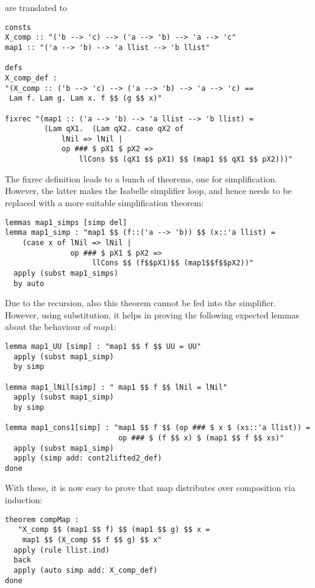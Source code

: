 \documentclass{llncs}
\begin{document}
\noindent 
are translated to

\begin{verbatim}
consts
X_comp :: "('b --> 'c) --> ('a --> 'b) --> 'a --> 'c"
map1 :: "('a --> 'b) --> 'a llist --> 'b llist"

defs
X_comp_def :
"(X_comp :: ('b --> 'c) --> ('a --> 'b) --> 'a --> 'c) ==
 Lam f. Lam g. Lam x. f $$ (g $$ x)"

fixrec "(map1 :: ('a --> 'b) --> 'a llist --> 'b llist) =
         (Lam qX1.  (Lam qX2. case qX2 of
             lNil => lNil |
             op ### $ pX1 $ pX2 =>
                 llCons $$ (qX1 $$ pX1) $$ (map1 $$ qX1 $$ pX2)))"
\end{verbatim}


\noindent 
The fixrec definition leads to a bunch of theorems, one for simplification.
However, the latter makes the Isabelle simplifier loop, and hence needs
to be replaced with a more suitable simplification theorem:
\begin{verbatim}
lemmas map1_simps [simp del]
lemma map1_simp : "map1 $$ (f::('a --> 'b)) $$ (x::'a llist) =
    (case x of lNil => lNil | 
               op ### $ pX1 $ pX2 => 
                    llCons $$ (f$$pX1)$$ (map1$$f$$pX2))"
  apply (subst map1_simps)
  by auto
\end{verbatim}

\noindent 
Due to the recursion, also this theorem cannot be fed into the simplifier.
However, using substitution, it helps in proving the following
expected lemmas about the behaviour of $map1$:

\begin{verbatim}
lemma map1_UU [simp] : "map1 $$ f $$ UU = UU"
  apply (subst map1_simp) 
  by simp

lemma map1_lNil[simp] : " map1 $$ f $$ lNil = lNil"
  apply (subst map1_simp) 
  by simp

lemma map1_cons1[simp] : "map1 $$ f $$ (op ### $ x $ (xs::'a llist)) =
                          op ### $ (f $$ x) $ (map1 $$ f $$ xs)"
  apply (subst map1_simp)
  apply (simp add: cont2lifted2_def)
done
\end{verbatim}

\noindent With these, it is now easy to prove that map distributes over
composition via induction:
\begin{verbatim}
theorem compMap : 
   "X_comp $$ (map1 $$ f) $$ (map1 $$ g) $$ x = 
    map1 $$ (X_comp $$ f $$ g) $$ x"
  apply (rule llist.ind)
  back
  apply (auto simp add: X_comp_def)
done
\end{verbatim}
\end{document}
